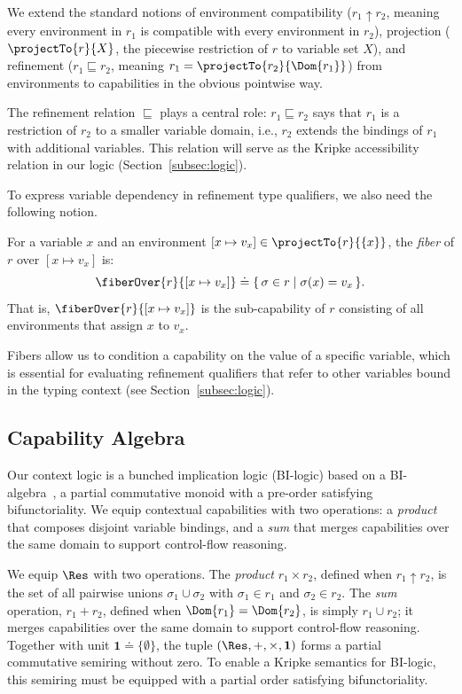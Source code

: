 We extend the standard notions of environment compatibility
($r_1 \uparrow r_2$, meaning every environment in $r_1$ is compatible
with every environment in $r_2$), projection ($\projectTo{r}{X}$, the
piecewise restriction of $r$ to variable set $X$), and refinement
($r_1 \sqsubseteq r_2$, meaning $r_1 = \projectTo{r_2}{\Dom{r_1}}$)
from environments to capabilities in the obvious pointwise way.

The refinement relation $\sqsubseteq$ plays a central role: $r_1
\sqsubseteq r_2$ says that $r_1$ is a restriction of $r_2$ to a
smaller variable domain, i.e., $r_2$ extends the bindings of $r_1$
with additional variables.  This relation will serve as the Kripke
accessibility relation in our logic (Section~\ref{subsec:logic}).

To express variable dependency in refinement type qualifiers, we also
need the following notion.

\begin{definition}[Fiber]\label{def:fibers}
  For a variable $x$ and an environment $[x \mapsto v_x] \in
  \projectTo{r}{\{x\}}$, the \emph{fiber} of $r$ over $[x \mapsto
  v_x]$ is:
  \[
    \fiberOver{r}{[x \mapsto v_x]} \doteq \{\, \sigma \in r \mid
    \sigma(x) = v_x \,\}.
  \]
  That is, $\fiberOver{r}{[x \mapsto v_x]}$ is the sub-capability of
  $r$ consisting of all environments that assign $x$ to $v_x$.
\end{definition}
\noindent Fibers allow us to condition a capability on the value of a
specific variable, which is essential for evaluating refinement
qualifiers that refer to other variables bound in the typing context
(see Section~\ref{subsec:logic}).

\subsection{Capability Algebra}\label{subsec:algebra}

Our context logic is a bunched implication logic (BI-logic) based on a
BI-algebra~\cite{...}, a partial commutative monoid with a pre-order
satisfying bifunctoriality.  We equip contextual capabilities with two
operations: a \emph{product} that composes disjoint variable bindings,
and a \emph{sum} that merges capabilities over the same domain to
support control-flow reasoning.

We equip $\Res$ with two operations. The \emph{product} $r_1 \times
r_2$, defined when $r_1 \uparrow r_2$, is the set of all pairwise
unions $\sigma_1 \cup \sigma_2$ with $\sigma_1 \in r_1$
and $\sigma_2 \in
r_2$.
The
\emph{sum} operation, $r_1 + r_2$, defined when $\Dom{r_1} = \Dom{r_2}$, is
simply $r_1 \cup r_2$; it merges capabilities over the same domain to
support control-flow reasoning. Together with unit $\mathbf{1} \doteq
\{\emptyset\}$, the tuple $(\Res, +, \times, \mathbf{1})$
forms a partial commutative semiring without zero. To enable a Kripke
semantics for BI-logic, this semiring must be equipped with a partial
order satisfying bifunctoriality.

